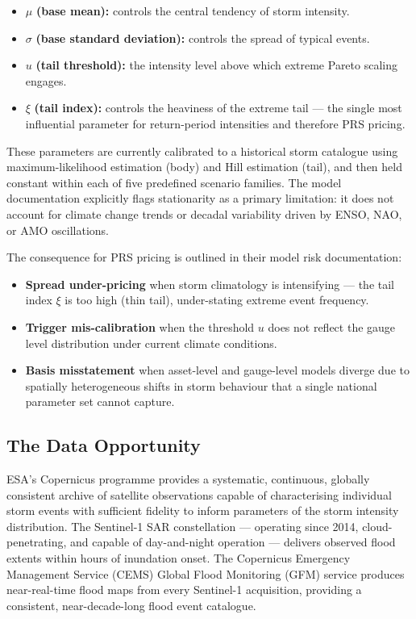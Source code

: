 \documentclass[11pt,a4paper]{article}
\begin{document}
\begin{itemize}
  \item $\mu$ \textbf{(base mean):} controls the central tendency of storm
  intensity.
  \item $\sigma$ \textbf{(base standard deviation):} controls the spread of
  typical events.
  \item $u$ \textbf{(tail threshold):} the intensity level above which extreme
  Pareto scaling engages.
  \item $\xi$ \textbf{(tail index):} controls the heaviness of the extreme tail
  --- the single most influential parameter for return-period intensities and
  therefore PRS pricing.
\end{itemize}

These parameters are currently calibrated to a historical storm catalogue using
maximum-likelihood estimation (body) and Hill estimation (tail), and then held
constant within each of five predefined scenario families. The model
documentation explicitly flags stationarity as a primary limitation: it does not
account for climate change trends or decadal variability driven by ENSO, NAO, or
AMO oscillations.

The consequence for PRS pricing is outlined in their model risk documentation:

\begin{itemize}
  \item \textbf{Spread under-pricing} when storm climatology is intensifying ---
  the tail index $\xi$ is too high (thin tail), under-stating extreme event
  frequency.
  \item \textbf{Trigger mis-calibration} when the threshold $u$ does not reflect
  the gauge level distribution under current climate conditions.
  \item \textbf{Basis misstatement} when asset-level and gauge-level models
  diverge due to spatially heterogeneous shifts in storm behaviour that a single
  national parameter set cannot capture.
\end{itemize}

\mkmpurpose

\subsection{The Data Opportunity}

ESA's Copernicus programme provides a systematic, continuous, globally consistent
archive of satellite observations capable of characterising individual storm
events with sufficient fidelity to inform parameters of the storm intensity
distribution. The Sentinel-1 SAR constellation --- operating since 2014,
cloud-penetrating, and capable of day-and-night operation --- delivers observed
flood extents within hours of inundation onset. The Copernicus Emergency
Management Service (CEMS) Global Flood Monitoring (GFM) service produces
near-real-time flood maps from every Sentinel-1 acquisition, providing a
consistent, near-decade-long flood event catalogue.
\end{document}

